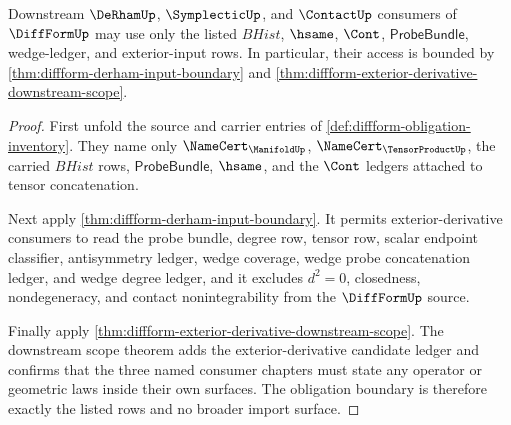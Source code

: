 \begin{theorem}
\label{thm:diffform-exterior-input-boundary-obligation}
Downstream $\DeRhamUp$, $\SymplecticUp$, and $\ContactUp$ consumers of
$\DiffFormUp$ may use only the listed $BHist$, $\hsame$, $\Cont$,
$\mathsf{ProbeBundle}$, wedge-ledger, and exterior-input rows. In particular,
their access is bounded by \autoref{thm:diffform-derham-input-boundary} and
\autoref{thm:diffform-exterior-derivative-downstream-scope}.
\end{theorem}
\begin{proof}
First unfold the source and carrier entries of
\autoref{def:diffform-obligation-inventory}. They name only
$\NameCert_{\ManifoldUp}$, $\NameCert_{\TensorProductUp}$, the carried
$BHist$ rows, $\mathsf{ProbeBundle}$, $\hsame$, and the $\Cont$ ledgers
attached to tensor concatenation.

Next apply \autoref{thm:diffform-derham-input-boundary}. It permits
exterior-derivative consumers to read the probe bundle, degree row, tensor
row, scalar endpoint classifier, antisymmetry ledger, wedge coverage, wedge
probe concatenation ledger, and wedge degree ledger, and it excludes $d^2=0$,
closedness, nondegeneracy, and contact nonintegrability from the
$\DiffFormUp$ source.

Finally apply
\autoref{thm:diffform-exterior-derivative-downstream-scope}. The downstream
scope theorem adds the exterior-derivative candidate ledger and confirms that
the three named consumer chapters must state any operator or geometric laws
inside their own surfaces. The obligation boundary is therefore exactly the
listed rows and no broader import surface.
\end{proof}
